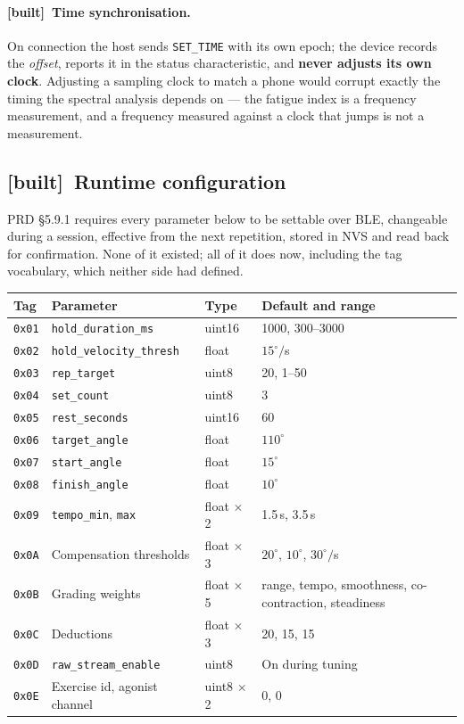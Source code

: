 \documentclass[11pt]{article}
\newcommand{\built}{{\sffamily\scriptsize\color{good}\textbf{[built]}}\ }
\begin{document}
\paragraph{\built Time synchronisation.} On connection the host sends
\texttt{SET\_TIME} with its own epoch; the device records the \emph{offset},
reports it in the status characteristic, and \textbf{never adjusts its own
clock}. Adjusting a sampling clock to match a phone would corrupt exactly the
timing the spectral analysis depends on --- the fatigue index is a frequency
measurement, and a frequency measured against a clock that jumps is not a
measurement.

\subsection{\built Runtime configuration}
\label{sec:config}

PRD \S5.9.1 requires every parameter below to be settable over BLE, changeable
during a session, effective from the next repetition, stored in NVS and read
back for confirmation. None of it existed; all of it does now, including the
tag vocabulary, which neither side had defined.

\begin{table}[H]
\centering\small
\begin{tabularx}{\linewidth}{@{}p{10mm} p{38mm} p{16mm} X@{}}
\toprule
\textbf{Tag} & \textbf{Parameter} & \textbf{Type} & \textbf{Default and range} \\
\midrule
\texttt{0x01} & \texttt{hold\_duration\_ms} & uint16 & 1000, 300--3000 \\
\texttt{0x02} & \texttt{hold\_velocity\_thresh} & float & $15^{\circ}/$s \\
\texttt{0x03} & \texttt{rep\_target} & uint8 & 20, 1--50 \\
\texttt{0x04} & \texttt{set\_count} & uint8 & 3 \\
\texttt{0x05} & \texttt{rest\_seconds} & uint16 & 60 \\
\texttt{0x06} & \texttt{target\_angle} & float & $110^{\circ}$ \\
\texttt{0x07} & \texttt{start\_angle} & float & $15^{\circ}$ \\
\texttt{0x08} & \texttt{finish\_angle} & float & $10^{\circ}$ \\
\texttt{0x09} & \texttt{tempo\_min}, \texttt{max} & float $\times$ 2 & 1.5\,s, 3.5\,s \\
\texttt{0x0A} & Compensation thresholds & float $\times$ 3 & $20^{\circ}$, $10^{\circ}$, $30^{\circ}/$s \\
\texttt{0x0B} & Grading weights & float $\times$ 5 & range, tempo, smoothness, co-contraction, steadiness \\
\texttt{0x0C} & Deductions & float $\times$ 3 & 20, 15, 15 \\
\texttt{0x0D} & \texttt{raw\_stream\_enable} & uint8 & On during tuning \\
\texttt{0x0E} & Exercise id, agonist channel & uint8 $\times$ 2 & 0, 0 \\
\bottomrule
\end{tabularx}
\end{table}
\end{document}
